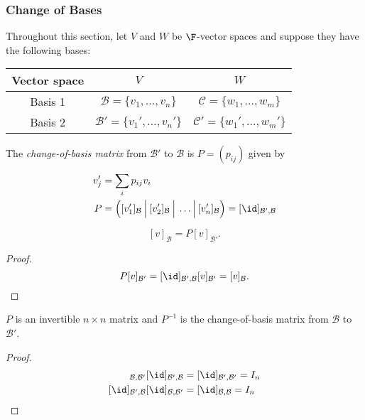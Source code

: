\documentclass[a4paper]{article}
\newcommand*{\basis}{\mathcal}
\theoremstyle{definition}
\begin{document}
\subsubsection{Change of Bases}

Throughout this section, let \(V\) and \(W\) be \(\F\)-vector spaces and suppose they have the following bases:
\begin{table}[htbp]
  \centering
  \begin{tabular}{|c||c|c|}
    \hline
    Vector space & \(V\) & \(W\) \\ \hline
    Basis 1 & \(\basis B = \{v_1,\dots,v_n\}\) & \(\basis C = \{w_1,\dots,w_m\}\) \\ \hline
    Basis 2 & \(\basis B' = \{v_1',\dots,v_n'\}\) & \(\basis C' = \{w_1',\dots,w_m'\}\) \\ \hline
  \end{tabular}
\end{table}

\begin{definition}
  The \emph{change-of-basis matrix} from \(\basis B'\) to \(\basis B\) is \(P = (p_{ij})\) given by
  \begin{align*}
    v_j' &= \sum_{i}^{ }p_{ij}v_i \\
    P &= \Big( [v_1']_{\basis B} \: \Big| \: [v_2']_{\basis B} \: \Big| \: \dots \Big| \: [v_n']_{\basis B} \Big) = [\id]_{\basis B', \basis B}
  \end{align*}
\end{definition}

\begin{lemma}
  \[
    [v]_{\basis B} = P[v]_{\basis B'}.
  \]
\end{lemma}

\begin{proof}
  \[
    P[v]_{\basis B'} = [\id]_{\basis B', \basis B}[v]_{\basis B'} = [v]_{\basis B}.
  \]
\end{proof}

\begin{lemma}
  \(P\) is an invertible \(n\times n\) matrix and \(P^{-1}\) is the change-of-basis matrix from \(\basis B\) to \(\basis B'\).
\end{lemma}

\begin{proof}
  \begin{align*}
    [\id]_{\basis B, \basis B'}[\id]_{\basis B', \basis B} &= [\id]_{\basis B', \basis B'} = I_n \\
    [\id]_{\basis B', \basis B}[\id]_{\basis B, \basis B'} &= [\id]_{\basis B, \basis B} = I_n
  \end{align*}
\end{proof}
\end{document}

